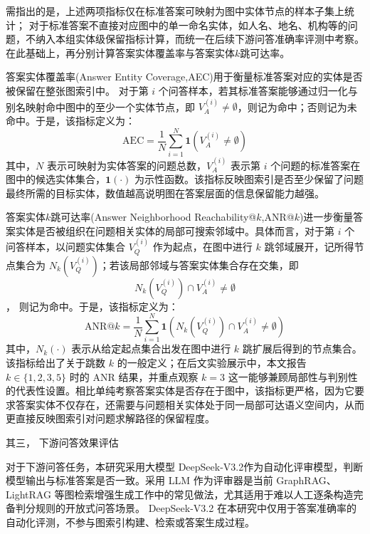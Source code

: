 \documentclass[promaster, vlined]{DissertUESTC}
\begin{document}
需指出的是，上述两项指标仅在标准答案可映射为图中实体节点的样本子集上统计；
对于标准答案不直接对应图中的单一命名实体，如人名、地名、机构等的问题，不纳入本组实体级保留指标计算，而统一在后续下游问答准确率评测中考察。在此基础上，再分别计算答案实体覆盖率与答案实体$k$跳可达率。

答案实体覆盖率(Answer Entity Coverage,AEC)用于衡量标准答案对应的实体是否被保留在整张图索引中。
对于第 $i$ 个问答样本，若其标准答案能够通过归一化与别名映射命中图中的至少一个实体节点，即 $V_A^{(i)} \neq \emptyset$，则记为命中；否则记为未命中。于是，该指标定义为：
\begin{equation}
\mathrm{AEC}=\frac{1}{N}\sum_{i=1}^{N}\mathbf{1}\!\left(V_A^{(i)} \neq \emptyset\right)
\end{equation}
其中，$N$ 表示可映射为实体答案的问题总数，$V_A^{(i)}$ 表示第 $i$ 个问题的标准答案在图中的候选实体集合，$\mathbf{1}(\cdot)$ 为示性函数。该指标反映图索引是否至少保留了问题最终所需的目标实体，数值越高说明图在答案层面的信息保留能力越强。

答案实体$k$跳可达率(Answer Neighborhood Reachability@$k$,ANR@$k$)进一步衡量答案实体是否被组织在问题相关实体的局部可搜索邻域中。具体而言，对于第 $i$ 个问答样本，以问题实体集合 $V_Q^{(i)}$ 作为起点，在图中进行 $k$ 跳邻域展开，记所得节点集合为 $N_k\!\left(V_Q^{(i)}\right)$；若该局部邻域与答案实体集合存在交集，即
\begin{equation}
N_k\!\left(V_Q^{(i)}\right)\cap V_A^{(i)} \neq \emptyset
\end{equation}
，
则记为命中。于是，该指标定义为：
\begin{equation}
\mathrm{ANR@}k=\frac{1}{N}\sum_{i=1}^{N}\mathbf{1}\!\left(N_k\!\left(V_Q^{(i)}\right)\cap V_A^{(i)} \neq \emptyset\right)
\end{equation}
其中，$N_k(\cdot)$ 表示从给定起点集合出发在图中进行 $k$ 跳扩展后得到的节点集合。该指标给出了关于跳数 $k$ 的一般定义；在后文实验展示中，本文报告 $k \in \{1,2,3,5\}$ 时的 ANR 结果，并重点观察 $k=3$ 这一能够兼顾局部性与判别性的代表性设置。相比单纯考察答案实体是否存在于图中，该指标更严格，因为它要求答案实体不仅存在，还需要与问题相关实体处于同一局部可达语义空间内，从而更直接反映图索引对问题求解路径的保留程度。

其三， 下游问答效果评估

对于下游问答任务，本研究采用大模型 DeepSeek-V3.2\cite{liu2025deepseek}作为自动化评审模型，判断模型输出与标准答案是否一致。采用 LLM 作为评审器是当前 GraphRAG、LightRAG 等图检索增强生成工作中的常见做法，尤其适用于难以人工逐条构造完备判分规则的开放式问答场景。
DeepSeek-V3.2 在本研究中仅用于答案准确率的自动化评测，不参与图索引构建、检索或答案生成过程。
\end{document}
